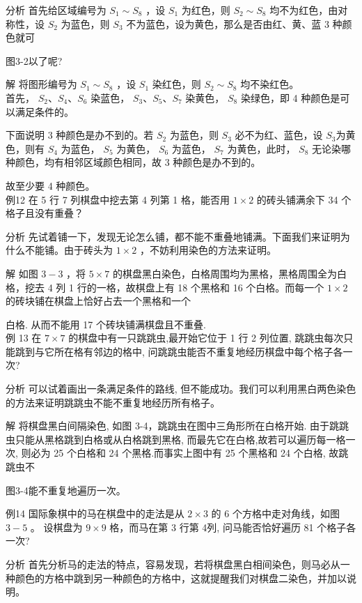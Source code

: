 \documentclass[10pt]{article}
\begin{document}
分析 首先给区域编号为 $S_{1} \sim S_{8}$ ，设 $S_{1}$ 为红色，则 $S_{2} \sim S_{8}$ 均不为红色，由对称性，设 $S_{2}$ 为蓝色，则 $S_{3}$ 不为蓝色，设为黄色，那么是否由红、黄、蓝 3 种颜色就可

图3-2以了呢?

解 将图形编号为 $S_{1} \sim S_{8}$ ，设 $S_{1}$ 染红色，则 $S_{2} \sim S_{8}$ 均不染红色。\\
首先， $S_{2} 、 S_{4} 、 S_{6}$ 染蓝色， $S_{3} 、 S_{5} 、 S_{7}$ 染黄色， $S_{8}$ 染绿色，即 4 种颜色是可以满足条件的。

下面说明 3 种颜色是办不到的。若 $S_{2}$ 为蓝色，则 $S_{3}$ 必不为红、蓝色，设 $S_{3}$为黄色，则有 $S_{4}$ 为蓝色， $S_{5}$ 为黄色， $S_{6}$ 为蓝色， $S_{7}$ 为黄色，此时， $S_{8}$ 无论染哪种颜色，均有相邻区域颜色相同，故 3 种颜色是办不到的。

故至少要 4 种颜色。\\
例12 在 5 行 7 列棋盘中挖去第 4 列第 1 格，能否用 $1 \times 2$ 的砖头铺满余下 34 个格子且没有重叠？

分析 先试着铺一下，发现无论怎么铺，都不能不重叠地铺满。下面我们来证明为什么不能铺。由于砖头为 $1 \times 2$ ，不妨利用染色的方法来证明。

解 如图 $3-3$ ，将 $5 \times 7$ 的棋盘黑白染色，白格周围均为黑格，黑格周围全为白格，挖去 4 列 1 行的一格，故棋盘上有 18 个黑格和 16 个白格。而每一个 $1 \times 2$ 的砖块铺在棋盘上恰好占去一个黑格和一个

白格. 从而不能用 17 个砖块铺满棋盘且不重叠.\\
例 13 在 $7 \times 7$ 的棋盘中有一只跳跳虫,最开始它位于 1 行 2 列位置, 跳跳虫每次只能跳到与它所在格有邻边的格中, 问跳跳虫能否不重复地经历棋盘中每个格子各一次?

分析 可以试着画出一条满足条件的路线, 但不能成功。我们可以利用黑白两色染色的方法来证明跳跳虫不能不重复地经历所有格子。

解 将棋盘黑白间隔染色, 如图 3-4，跳跳虫在图中三角形所在白格开始. 由于跳跳虫只能从黑格跳到白格或从白格跳到黑格, 而最先它在白格,故若可以遍历每一格一次, 则必为 25 个白格和 24 个黑格.而事实上图中有 25 个黑格和 24 个白格, 故跳跳虫不

图3-4能不重复地遍历一次。

例14 国际象棋中的马在棋盘中的走法是从 $2 \times 3$ 的 6 个方格中走对角线，如图 $3-5$ 。 设棋盘为 $9 \times 9$ 格，而马在第 3 行第 4列, 问马能否恰好遍历 81 个格子各一次?

分析 首先分析马的走法的特点，容易发现，若将棋盘黑白相间染色，则马必从一种颜色的方格中跳到另一种颜色的方格中，这就提醒我们对棋盘二染色，并加以说明。
\end{document}
